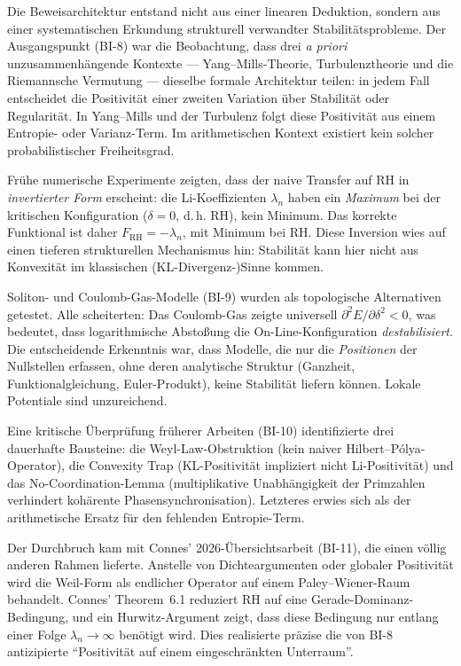 \documentclass[12pt,a4paper]{article}
\theoremstyle{definition}
\theoremstyle{remark}
\begin{document}
Die Beweisarchitektur entstand nicht aus einer linearen Deduktion, sondern aus einer systematischen Erkundung strukturell verwandter Stabilitätsprobleme. Der Ausgangspunkt (BI-8) war die Beobachtung, dass drei \emph{a priori} unzusammenhängende Kontexte --- Yang--Mills-Theorie, Turbulenztheorie und die Riemannsche Vermutung --- dieselbe formale Architektur teilen: in jedem Fall entscheidet die Positivität einer zweiten Variation über Stabilität oder Regularität. In Yang--Mills und der Turbulenz folgt diese Positivität aus einem Entropie- oder Varianz-Term. Im arithmetischen Kontext existiert kein solcher probabilistischer Freiheitsgrad.

Frühe numerische Experimente zeigten, dass der naive Transfer auf RH in \emph{invertierter Form} erscheint: die Li-Koeffizienten $\lambda_n$ haben ein \emph{Maximum} bei der kritischen Konfiguration ($\delta = 0$, d.\,h. RH), kein Minimum. Das korrekte Funktional ist daher $F_{\mathrm{RH}} = -\lambda_n$, mit Minimum bei RH. Diese Inversion wies auf einen tieferen strukturellen Mechanismus hin: Stabilität kann hier nicht aus Konvexität im klassischen (KL-Divergenz-)Sinne kommen.

Soliton- und Coulomb-Gas-Modelle (BI-9) wurden als topologische Alternativen getestet. Alle scheiterten: Das Coulomb-Gas zeigte universell $\partial^2 E/\partial\delta^2 < 0$, was bedeutet, dass logarithmische Abstoßung die On-Line-Konfiguration \emph{destabilisiert}. Die entscheidende Erkenntnis war, dass Modelle, die nur die \emph{Positionen} der Nullstellen erfassen, ohne deren analytische Struktur (Ganzheit, Funktionalgleichung, Euler-Produkt), keine Stabilität liefern können. Lokale Potentiale sind unzureichend.

Eine kritische Überprüfung früherer Arbeiten (BI-10) identifizierte drei dauerhafte Bausteine: die Weyl-Law-Obstruktion (kein naiver Hilbert--P\'olya-Operator), die Convexity Trap (KL-Positivität impliziert nicht Li-Positivität) und das No-Coordination-Lemma (multiplikative Unabhängigkeit der Primzahlen verhindert kohärente Phasensynchronisation). Letzteres erwies sich als der arithmetische Ersatz für den fehlenden Entropie-Term.

Der Durchbruch kam mit Connes' 2026-Übersichtsarbeit \cite{Connes2026} (BI-11), die einen völlig anderen Rahmen lieferte. Anstelle von Dichteargumenten oder globaler Positivität wird die Weil-Form als endlicher Operator auf einem Paley--Wiener-Raum behandelt. Connes' Theorem~6.1 reduziert RH auf eine Gerade-Dominanz-Bedingung, und ein Hurwitz-Argument zeigt, dass diese Bedingung nur entlang einer Folge $\lambda_n \to \infty$ benötigt wird. Dies realisierte präzise die von BI-8 antizipierte ``Positivität auf einem eingeschränkten Unterraum''.
\end{document}
